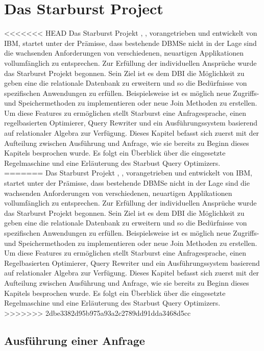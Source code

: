 \section{Das Starburst Project}

<<<<<<< HEAD
Das Starburst Projekt \cite{lohman1988Starbust}, \cite{haas1989extensible}, vorangetrieben und entwickelt von IBM,  startet unter der Prämisse, dass bestehende DBMSe nicht in der Lage sind die wachsenden Anforderungen von verschiedenen, neuartigen Applikationen vollumfänglich zu entsprechen. Zur Erfüllung der individuellen Ansprüche wurde das Starburst Projekt begonnen. Sein Ziel ist es dem \ac{DBI} die Möglichkeit zu geben eine die relationale Datenbank zu erweitern und so die Bedürfnisse von spezifischen Anwendungen zu erfüllen. Beispielsweise ist es möglich neue Zugriffs- und Speichermethoden zu implementieren oder neue Join Methoden zu erstellen. Um diese Features zu ermöglichen stellt Starburst eine Anfragesprache, einen regelbasierten Optimierer, Query Rewriter und ein Ausführungssystem basierend auf relationaler Algebra zur Verfügung. Dieses Kapitel befasst sich zuerst mit der Aufteilung zwischen Ausführung und Anfrage, wie sie bereits zu Beginn dieses Kapitels besprochen wurde. Es folgt ein Überblick über die eingesetzte Regelmaschine und eine Erläuterung des Starbust Query Optimizers.
=======
Das Starburst Projekt \cite{lohman1988Starbust}, \cite{haas1989extensible}, vorangetrieben und entwickelt von IBM,  startet unter der Prämisse, dass bestehende DBMSe nicht in der Lage sind die wachsenden Anforderungen von verschiedenen, neuartigen Applikationen vollumfänglich zu entsprechen. Zur Erfüllung der individuellen Ansprüche wurde das Starburst Projekt begonnen. Sein Ziel ist es dem \ac{DBI} die Möglichkeit zu geben eine die relationale Datenbank zu erweitern und so die Bedürfnisse von spezifischen Anwendungen zu erfüllen. Beispielsweise ist es möglich neue Zugriffs- und Speichermethoden zu implementieren oder neue Join Methoden zu erstellen. Um diese Features zu ermöglichen stellt Starburst eine Anfragesprache, einen Regelbasierten Optimierer, Query Rewriter und ein Ausführungssystem basierend auf relationaler Algebra zur Verfügung. Dieses Kapitel befasst sich zuerst mit der Aufteilung zwischen Ausführung und Anfrage, wie sie bereits zu Beginn dieses Kapitels besprochen wurde. Es folgt ein Überblick über die eingesetzte Regelmaschine und eine Erläuterung des Starbust Query Optimizers.
>>>>>>> 2dbe3382d95b975a93a2c2789dd91dda3468d5cc

\subsection{Ausführung einer Anfrage}

